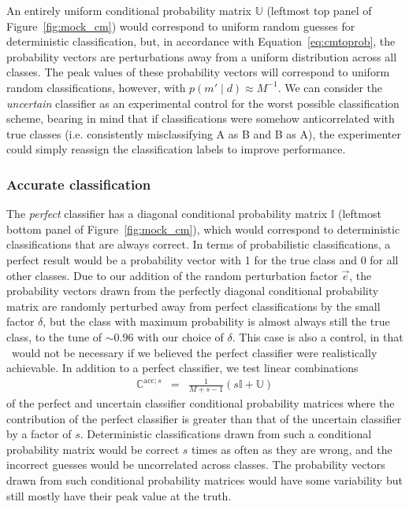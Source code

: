An entirely uniform conditional probability matrix $\mathbb{U}$ (leftmost top panel of Figure~\ref{fig:mock_cm}) would correspond to uniform random guesses for deterministic classification, but, in accordance with Equation~\ref{eq:cmtoprob}, the probability vectors are perturbations away from a uniform distribution across all classes.
The peak values of these probability vectors will correspond to uniform random classifications, however, with $p(m' \mid d)\approx M^{-1}$.
We can consider the \textit{uncertain} classifier as an experimental control for the worst possible classification scheme, bearing in mind that if classifications were somehow anticorrelated with true classes (i.e. consistently misclassifying A as B and B as A), the experimenter could simply reassign the classification labels to improve performance.

\subsubsection{Accurate classification}
\label{sec:accuratedata}

The \textit{perfect} classifier has a diagonal conditional probability matrix $\mathbb{I}$ (leftmost bottom panel of Figure~\ref{fig:mock_cm}), which would correspond to deterministic classifications that are always correct. In terms of probabilistic classifications, a perfect result would be a probability vector with 1 for the true class and 0 for all other classes. Due to our addition of the random perturbation factor $\vec{e}$, the probability vectors drawn from the perfectly diagonal conditional probability matrix are randomly perturbed away from perfect classifications by the small factor $\delta$, but the class with maximum probability is almost always still the true class, to the tune of $\sim0.96$ with our choice of $\delta$. This case is also a control, in that \plasticc\ would not be necessary if we believed the perfect classifier were realistically achievable. In addition to a perfect classifier, we test linear combinations
\begin{eqnarray}
  \label{eq:lincomb}
  \mathbb{C}^{\mathrm{acc}; s} &=& \frac{1}{M+s-1} \left(s\mathbb{I} + \mathbb{U}\right)
\end{eqnarray}
of the perfect and uncertain classifier conditional probability matrices where the contribution of the perfect classifier is greater than that of the uncertain classifier by a factor of $s$. Deterministic classifications drawn from such a conditional probability matrix would be correct $s$ times as often as they are wrong, and the incorrect guesses would be uncorrelated across classes. The probability vectors drawn from such conditional probability matrices would have some variability but still mostly have their peak value at the truth.

